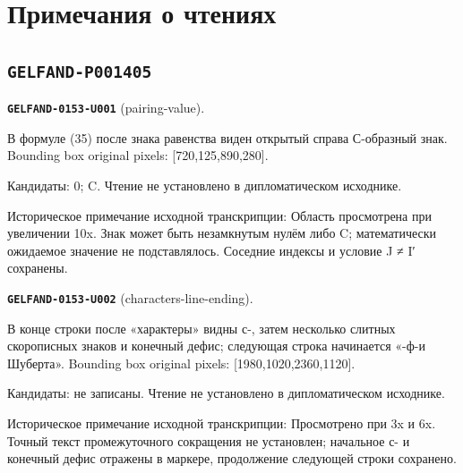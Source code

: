 \section*{Примечания о чтениях}
\subsection*{\texttt{GELFAND-P001405}}
\par\noindent\leavevmode{}\label{GELFAND-0153-U001}\textbf{\texttt{GELFAND-0153-U001}} (pairing-value).\nopagebreak[4]\par
В формуле (35) после знака равенства виден открытый справа С-образный знак. Bounding box original pixels: [720,125,890,280].\par
Кандидаты: 0; C. Чтение не установлено в дипломатическом исходнике.\par
Историческое примечание исходной транскрипции: Область просмотрена при увеличении 10x. Знак может быть незамкнутым нулём либо C; математически ожидаемое значение не подставлялось. Соседние индексы и условие J ≠ I′ сохранены.\par\medskip
\par\noindent\leavevmode{}\label{GELFAND-0153-U002}\textbf{\texttt{GELFAND-0153-U002}} (characters-line-ending).\nopagebreak[4]\par
В конце строки после «характеры» видны с-, затем несколько слитных скорописных знаков и конечный дефис; следующая строка начинается «-ф-и Шуберта». Bounding box original pixels: [1980,1020,2360,1120].\par
Кандидаты: не записаны. Чтение не установлено в дипломатическом исходнике.\par
Историческое примечание исходной транскрипции: Просмотрено при 3x и 6x. Точный текст промежуточного сокращения не установлен; начальное с- и конечный дефис отражены в маркере, продолжение следующей строки сохранено.\par\medskip
